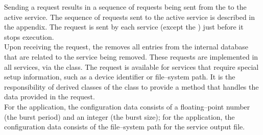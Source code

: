 Sending a  request results in a
sequence of requests being sent from the 
to the active service.
The sequence of requests sent to the active service is described in the 
 appendix.
The  request is sent by each
service (except the ) just before it stops
execution.\\

Upon receiving the  request,
the  removes all entries from the internal
database that are related to the service being removed.
\secondaryEnd{}
These requests are implemented in all \mplusm{}  services, via the
 class.
The  request is available for
 services that require special setup information, such as a device
identifier or file--system path.
It is the responsibility of derived classes of the
 class to provide a method
that handles the data provided in the
 request.\\

For the  application, the configuration
data consists of a floating--point number (the burst period) and an integer (the burst
size); for the  application, the
configuration data consists of the file--system path for the service output file.\\

